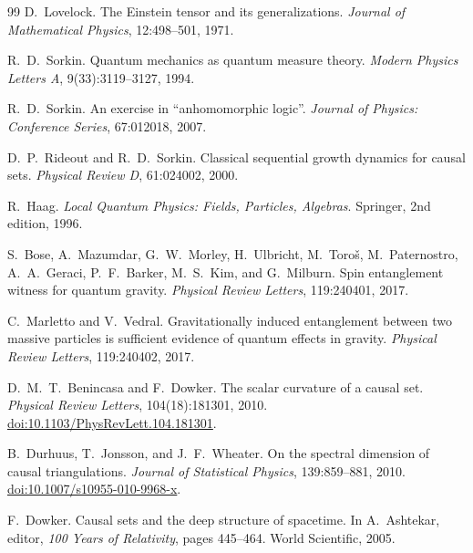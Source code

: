 \documentclass[11pt,a4paper]{article}
\theoremstyle{plain}
\theoremstyle{definition}
\theoremstyle{remark}
\begin{document}
\begin{thebibliography}{99}
D.~Lovelock.
\newblock The Einstein tensor and its generalizations.
\newblock \textit{Journal of Mathematical Physics}, 12:498--501, 1971.

R.~D.~Sorkin.
\newblock Quantum mechanics as quantum measure theory.
\newblock \textit{Modern Physics Letters A}, 9(33):3119--3127, 1994.

R.~D.~Sorkin.
\newblock An exercise in ``anhomomorphic logic''.
\newblock \textit{Journal of Physics: Conference Series}, 67:012018, 2007.

D.~P.~Rideout and R.~D.~Sorkin.
\newblock Classical sequential growth dynamics for causal sets.
\newblock \textit{Physical Review D}, 61:024002, 2000.

R.~Haag.
\newblock \textit{Local Quantum Physics: Fields, Particles, Algebras}.
\newblock Springer, 2nd edition, 1996.

S.~Bose, A.~Mazumdar, G.~W.~Morley, H.~Ulbricht, M.~Toro\v{s},
  M.~Paternostro, A.~A.~Geraci, P.~F.~Barker, M.~S.~Kim, and G.~Milburn.
\newblock Spin entanglement witness for quantum gravity.
\newblock \textit{Physical Review Letters}, 119:240401, 2017.

C.~Marletto and V.~Vedral.
\newblock Gravitationally induced entanglement between two massive particles is
  sufficient evidence of quantum effects in gravity.
\newblock \textit{Physical Review Letters}, 119:240402, 2017.


D.~M.~T.~Benincasa and F.~Dowker.
\newblock The scalar curvature of a causal set.
\newblock \emph{Physical Review Letters}, 104(18):181301, 2010.
\newblock \href{https://doi.org/10.1103/PhysRevLett.104.181301}{doi:10.1103/PhysRevLett.104.181301}.

B.~Durhuus, T.~Jonsson, and J.~F.~Wheater.
\newblock On the spectral dimension of causal triangulations.
\newblock \emph{Journal of Statistical Physics}, 139:859--881, 2010.
\newblock \href{https://doi.org/10.1007/s10955-010-9968-x}{doi:10.1007/s10955-010-9968-x}.

F.~Dowker.
\newblock Causal sets and the deep structure of spacetime.
\newblock In A.~Ashtekar, editor, \textit{100 Years of Relativity}, pages
  445--464. World Scientific, 2005.


\end{thebibliography}
\end{document}
